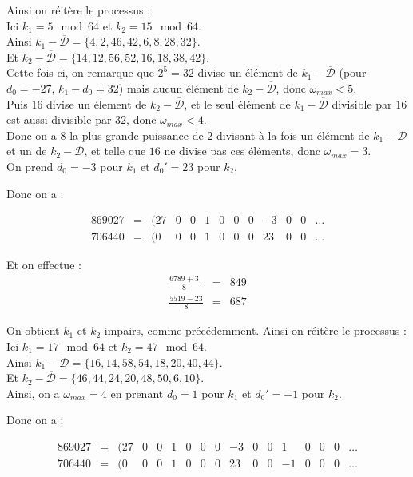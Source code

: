 \documentclass[12pt, a4paper]{memoir}
\newcommand{\dbarre}{\overline{\mathcal{D}}}
\begin{document}
 Ainsi on réitère le processus : \\
 Ici $k_1 = 5 \mod 64$ et $k_2 = 15 \mod 64$. \\
Ainsi  $k_1 - \dbarre = \{4,2,46,42,6,8,28,32\}$. \\
Et  $k_2 - \dbarre = \{14,12,56,52,16,18,38,42\}$. \\ 
 Cette fois-ci, on remarque que $2^5 = 32$ divise un élément de $k_1 - \dbarre$ (pour $d_0 = -27$, $k_1 - d_0 = 32$) 
 mais aucun élément de $k_2 - \dbarre$, donc $\omega_{max} < 5$. \\
Puis $16$ divise un élement de $k_2 - \dbarre$, et le seul élément de $k_1 - \dbarre$ divisible par $16$ est aussi
divisible par $32$, donc $\omega_{max} < 4$. \\
Donc on a $8$ la plus grande puissance de $2$ divisant à la fois un élément de $k_1 - \dbarre$
et un de $k_2 - \dbarre$, et telle que $16$ ne divise pas ces éléments, donc $\omega_{max} = 3$. \\
On prend $d_0 = -3$ pour $k_1$ et $d_0' = 23$ pour $k_2$.
 
Donc on a :
 
 $$\begin{array}{ccccccccccccc}
  869027 & = & (27 & 0 & 0 & 1 & 0 & 0 & 0 & -3 & 0 & 0 & \ldots \\
  706440 & = & (0 & 0 & 0 & 1 & 0 & 0 & 0 & 23 & 0 & 0 & \ldots
 \end{array}$$
 
 Et on effectue :
 $$\begin{array}{cccccc}
  \frac{6789 + 3}{8} & = & 849 \\
  \frac{5519-23}{8} & = & 687
 \end{array}$$
 
 On obtient $k_1$ et $k_2$ impairs, comme précédemment. Ainsi on réitère le processus : \\
 Ici $k_1 = 17 \mod 64$ et $k_2 = 47 \mod 64$. \\
Ainsi  $k_1 - \dbarre = \{16,14,58,54,18,20,40,44\}$. \\
Et  $k_2 - \dbarre = \{46,44,24,20,48,50,6,10\}$. \\ 
 Ainsi, on a $\omega_{max} = 4$ en prenant $d_0 = 1$ pour $k_1$ et $d_0' = -1$ pour $k_2$.

Donc on a :
 
 $$\begin{array}{ccccccccccccccccc}
  869027 & = & (27 & 0 & 0 & 1 & 0 & 0 & 0 & -3 & 0 & 0 & 1 & 0 & 0 & 0 & \ldots \\
  706440 & = & (0 & 0 & 0 & 1 & 0 & 0 & 0 & 23 & 0 & 0 & -1 & 0 & 0 & 0 & \ldots
 \end{array}$$
 
\end{document}
